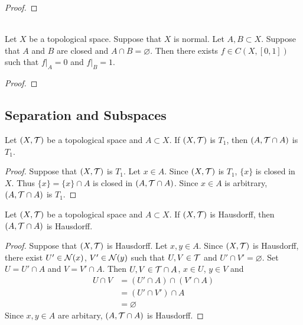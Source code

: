 \documentclass{book}
\begin{document}
	\begin{proof}
	\end{proof}

	\begin{ex}  \\
		Let $X$ be a topological space. Suppose that $X$ is normal. Let $A,B \subset X$. Suppose that $A$ and $B$ are closed and $A \cap B = \varnothing$. Then there exists $f \in C(X, [0,1])$ such that $f|_A = 0$ and $f|_B = 1$. 
	\end{ex}
	
	\begin{proof}
	\end{proof}






























	\subsection{Separation and Subspaces}
	
	\begin{ex}
		Let $(X, \mathcal{T})$ be a topological space and $A \subset X$. If $(X, \mathcal{T})$ is $T_1$, then $(A, \mathcal{T} \cap A)$ is $T_1$.
	\end{ex}
	
	\begin{proof}
		Suppose that $(X, \mathcal{T})$ is $T_1$. Let $x \in A$. Since $(X, \mathcal{T})$ is $T_1$, $\{x\}$ is closed in $X$. Thus $\{x\} = \{x\} \cap A$ is closed in $(A, \mathcal{T} \cap A)$. Since $x \in A$ is arbitrary, $(A, \mathcal{T} \cap A)$ is $T_1$. 
	\end{proof}
	
	\begin{ex}
		Let $(X, \mathcal{T})$ be a topological space and $A \subset X$. If $(X, \mathcal{T})$ is Hausdorff, then $(A, \mathcal{T} \cap A)$ is Hausdorff.
	\end{ex}
	
	\begin{proof}
		Suppose that $(X, \mathcal{T})$ is Hausdorff. Let $x, y \in A$. Since $(X, \mathcal{T})$ is Hausdorff, there exist $U' \in \mathcal{N}(x)$, $V' \in \mathcal{N}(y)$ such that $U,V \in \mathcal{T}$ and $U' \cap V' = \varnothing$. Set $U = U' \cap A$ and $V = V' \cap A$. Then $U, V \in \mathcal{T} \cap A$, $x \in U$, $y \in V$ and 
		\begin{align*}
			U \cap V
			& = (U' \cap A) \cap (V' \cap A) \\
			& = (U' \cap V') \cap A \\
			& = \varnothing
		\end{align*}
		Since $x,y \in A$ are arbitary, $(A, \mathcal{T} \cap A)$ is Hausdorff.
	\end{proof}
\end{document}

